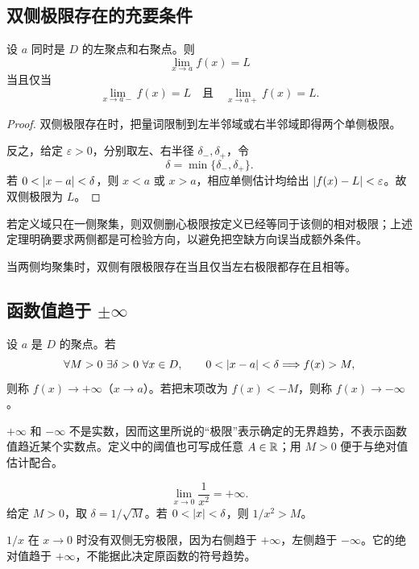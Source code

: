 \subsection{双侧极限存在的充要条件}

\begin{theorem}[双侧与单侧极限]
设 \(a\) 同时是 \(D\) 的左聚点和右聚点。则
\[
 \lim_{x\to a}f(x)=L
\]
当且仅当
\[
 \lim_{x\to a-}f(x)=L
 \quad\text{且}\quad
 \lim_{x\to a+}f(x)=L.
\]
\end{theorem}

\begin{proof}
双侧极限存在时，把量词限制到左半邻域或右半邻域即得两个单侧极限。

反之，给定 \(\varepsilon>0\)，分别取左、右半径 \(\delta_-,\delta_+\)，令
\[
 \delta=\min\{\delta_-,\delta_+\}.
\]
若 \(0<\left|x-a\right|<\delta\)，则 \(x<a\) 或 \(x>a\)，相应单侧估计均给出 \(\left|f(x)-L\right|<\varepsilon\)。故双侧极限为 \(L\)。
\end{proof}

若定义域只在一侧聚集，则双侧删心极限按定义已经等同于该侧的相对极限；上述定理明确要求两侧都是可检验方向，以避免把空缺方向误当成额外条件。

\begin{corollary}
当两侧均聚集时，双侧有限极限存在当且仅当左右极限都存在且相等。
\end{corollary}

\subsection{函数值趋于 \texorpdfstring{\(\pm\infty\)}{infinity}}

\begin{definition}[无穷极限]
设 \(a\) 是 \(D\) 的聚点。若
\[
 \forall M>0\ \exists\delta>0\ \forall x\in D,\qquad
 0<\abs{x-a}<\delta\Longrightarrow f(x)>M,
\]
则称 \(f(x)\to+\infty\)（\(x\to a\)）。若把末项改为 \(f(x)<-M\)，则称 \(f(x)\to-\infty\)。
\end{definition}

\(+\infty\) 和 \(-\infty\) 不是实数，因而这里所说的“极限”表示确定的无界趋势，不表示函数值趋近某个实数点。定义中的阈值也可写成任意 \(A\in\mathbb{R}\)；用 \(M>0\) 便于与绝对值估计配合。

\begin{example}
\[
 \lim_{x\to0}\frac1{x^2}=+\infty.
\]
给定 \(M>0\)，取 \(\delta=1/\sqrt M\)。若 \(0<\left|x\right|<\delta\)，则 \(1/x^2>M\)。
\end{example}

\begin{counterexample}
\(1/x\) 在 \(x\to0\) 时没有双侧无穷极限，因为右侧趋于 \(+\infty\)，左侧趋于 \(-\infty\)。它的绝对值趋于 \(+\infty\)，不能据此决定原函数的符号趋势。
\end{counterexample}

